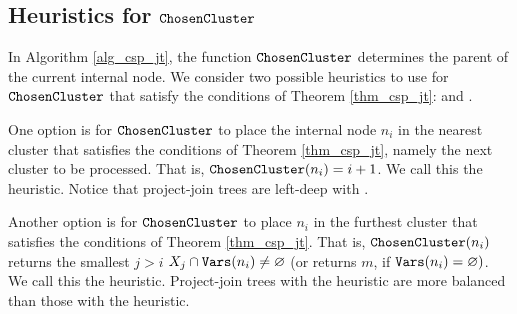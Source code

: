 
\subsection{Heuristics for $\texttt{\upshape ChosenCluster}$}

In Algorithm \ref{alg_csp_jt}, the function $\texttt{\upshape ChosenCluster}$ determines the parent of the current internal node.
We consider two possible heuristics to use for $\texttt{\upshape ChosenCluster}$ that satisfy the conditions of Theorem \ref{thm_csp_jt}:  and  \cite{dudek2020addmc}.

One option is for $\texttt{\upshape ChosenCluster}$ to place the internal node $n_i$ in the nearest cluster that satisfies the conditions of Theorem \ref{thm_csp_jt}, namely the next cluster to be processed.
That is, $\texttt{\upshape ChosenCluster}(n_i) = i + 1$.
We call this the  heuristic.
Notice that project-join trees are left-deep with \ListH{}.

Another option is for $\texttt{\upshape ChosenCluster}$ to place $n_i$ in the furthest cluster that satisfies the conditions of Theorem \ref{thm_csp_jt}.
That is, $\texttt{\upshape ChosenCluster}(n_i)$ returns the smallest $j > i$ \st{} $X_j \cap \texttt{\upshape Vars}(n_i) \ne \varnothing$ (or returns $m$, if $\texttt{\upshape Vars}(n_i) = \varnothing)$.
We call this the  heuristic.
Project-join trees with the \TreeH{} heuristic are more balanced than those with the \ListH{} heuristic.
